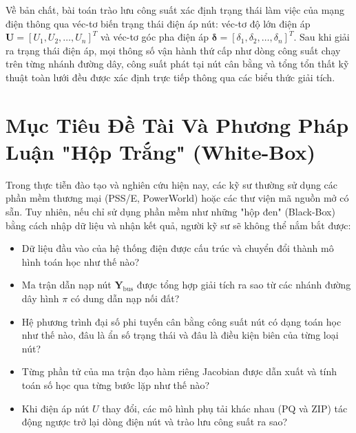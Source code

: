 \documentclass[12pt,a4paper,oneside]{report}
\begin{document}
Về bản chất, bài toán trào lưu công suất xác định trạng thái làm việc của mạng điện thông qua véc-tơ biến trạng thái điện áp nút: véc-tơ độ lớn điện áp $\mathbf{U} = [U_1, U_2, \dots, U_n]^T$ và véc-tơ góc pha điện áp $\boldsymbol{\delta} = [\delta_1, \delta_2, \dots, \delta_n]^T$. Sau khi giải ra trạng thái điện áp, mọi thông số vận hành thứ cấp như dòng công suất chạy trên từng nhánh đường dây, công suất phát tại nút cân bằng và tổng tổn thất kỹ thuật toàn lưới đều được xác định trực tiếp thông qua các biểu thức giải tích.

\section{Mục Tiêu Đề Tài Và Phương Pháp Luận "Hộp Trắng" (White-Box)}
Trong thực tiễn đào tạo và nghiên cứu hiện nay, các kỹ sư thường sử dụng các phần mềm thương mại (PSS/E, PowerWorld) hoặc các thư viện mã nguồn mở có sẵn. Tuy nhiên, nếu chỉ sử dụng phần mềm như những "hộp đen" (Black-Box) bằng cách nhập dữ liệu và nhận kết quả, người kỹ sư sẽ không thể nắm bắt được:
\begin{itemize}
    \item Dữ liệu đầu vào của hệ thống điện được cấu trúc và chuyển đổi thành mô hình toán học như thế nào?
    \item Ma trận dẫn nạp nút $\mathbf{Y}_{\text{bus}}$ được tổng hợp giải tích ra sao từ các nhánh đường dây hình $\pi$ có dung dẫn nạp nối đất?
    \item Hệ phương trình đại số phi tuyến cân bằng công suất nút có dạng toán học như thế nào, đâu là ẩn số trạng thái và đâu là điều kiện biên của từng loại nút?
    \item Từng phần tử của ma trận đạo hàm riêng Jacobian được dẫn xuất và tính toán số học qua từng bước lặp như thế nào?
    \item Khi điện áp nút $U$ thay đổi, các mô hình phụ tải khác nhau (PQ và ZIP) tác động ngược trở lại dòng điện nút và trào lưu công suất ra sao?
\end{itemize}
\end{document}
